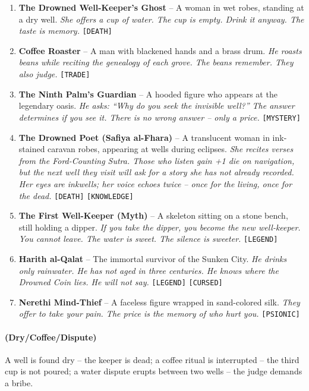 \begin{enumerate}
\item[J] \textbf{The Drowned Well-Keeper's Ghost} -- A woman in wet robes, standing at a dry well.
  \hfill \textit{She offers a cup of water. The cup is empty. Drink it anyway. The taste is memory.} \texttt{[DEATH]}
\item[Q] \textbf{Coffee Roaster} -- A man with blackened hands and a brass drum.
  \hfill \textit{He roasts beans while reciting the genealogy of each grove. The beans remember. They also judge.} \texttt{[TRADE]}
\item[K] \textbf{The Ninth Palm's Guardian} -- A hooded figure who appears at the legendary oasis.
  \hfill \textit{He asks: ``Why do you seek the invisible well?'' The answer determines if you see it. There is no wrong answer -- only a price.} \texttt{[MYSTERY]}
\item[L] \textbf{The Drowned Poet (Safiya al-Fhara)} -- A translucent woman in ink-stained caravan robes, appearing at wells during eclipses.
  \hfill \textit{She recites verses from the \textit{Ford-Counting Sutra}. Those who listen gain +1 die on navigation, but the next well they visit will ask for a story she has not already recorded. Her eyes are inkwells; her voice echoes twice -- once for the living, once for the dead.} \texttt{[DEATH]} \texttt{[KNOWLEDGE]}
\item[A] \textbf{The First Well-Keeper (Myth)} -- A skeleton sitting on a stone bench, still holding a dipper.
  \hfill \textit{If you take the dipper, you become the new well-keeper. You cannot leave. The water is sweet. The silence is sweeter.} \texttt{[LEGEND]}
\item[A+] \textbf{Harith al-Qalat} -- The immortal survivor of the Sunken City.
  \hfill \textit{He drinks only rainwater. He has not aged in three centuries. He knows where the Drowned Coin lies. He will not say.} \texttt{[LEGEND]} \texttt{[CURSED]}
\item[N] \textbf{Nerethi Mind-Thief} -- A faceless figure wrapped in sand-colored silk.
  \hfill \textit{They offer to take your pain. The price is the memory of who hurt you.} \texttt{[PSIONIC]}
\end{enumerate}

\paragraph*{(Dry/Coffee/Dispute)} A well is found dry -- the keeper is dead; a coffee ritual is interrupted -- the third cup is not poured; a water dispute erupts between two wells -- the judge demands a bribe.

